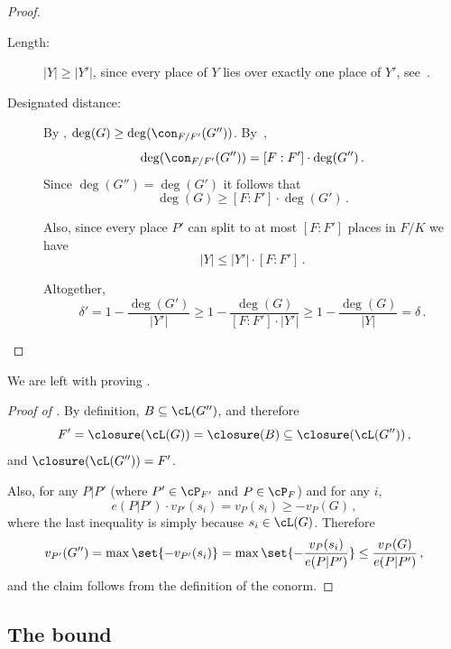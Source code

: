 \begin{proof}
\begin{description}
\item [Length:] $|Y| \ge |Y'|$, since every place of $Y$ lies over exactly one place of $Y'$,
see~\cite[Proposition III.1.7]{S:93}.

\item [Designated distance:]
By , $\deg(G) \ge \deg( \con_{F/F'}(G''))$. By~\cite[Cor III.1.13]{S:93},
$$\deg(\con_{F/F'}(G''))=[F:F'] \cdot \deg(G'')\,.$$ Since
$\deg(G'')=\deg(G')$ it follows that $$\deg(G) \ge [F:F'] \cdot
\deg(G')\,.$$

Also, since every place $P'$ can split to at most $[F:F']$ places in
$F/K$ we have $$|Y| \le |Y'| \cdot [F:F']\,.$$

Altogether,
$$\delta' = 1 - \frac{\deg(G')}{|Y'|}
\ge  1 - \frac{\deg(G)}{[F:F'] \cdot |Y'|} \ge 1 -
\frac{\deg(G)}{|Y|} = \delta\,.$$
\end{description}
\end{proof}

We are left with proving .

\begin{proof}[Proof of ]
 By definition, $B \subseteq \cL(G'')$, and therefore
$$F' = \closure(\cL(G)) = \closure(B) \subseteq \closure(\cL(G''))\,,$$
and $\closure(\cL(G''))=F'$.

Also, for any $P|P'$ (where  $P' \in \cP_{F'}$ and $P \in \cP_F$)
and for any $i$, $$e(P|P') \cdot v_{P'}(s_i) = v_{P}(s_i) \ge
-v_{P}(G)\,,$$ where the last inequality is simply because $s_i \in
\cL(G)$. Therefore
$$v_{P'}(G'') = \max \set{-v_{P'}(s_i)} =
\max \set{- \frac{v_{P}(s_i)}{e(P|P')}} \le
\frac{v_{P}(G)}{e(P|P')}\,,$$ and the claim follows from the definition
of the conorm.
\end{proof}

\subsection{The bound}

